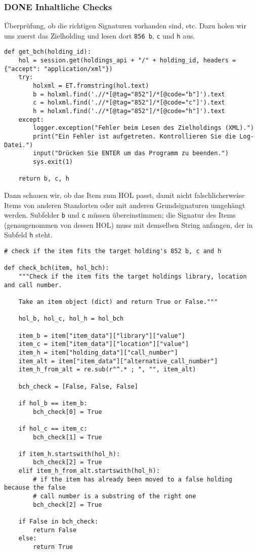 \documentclass[10pt, a4paper]{scrartcl}
\begin{document}
\subsubsection{{\bfseries\sffamily DONE} Inhaltliche Checks}
\label{sec:org2ce0e97}
Überprüfung, ob die richtigen Signaturen vorhanden sind, etc. Dazu holen
wir uns zuerst das Zielholding und lesen dort \texttt{856 b}, \texttt{c} und \texttt{h} aus.

\begin{verbatim}
def get_bch(holding_id):
    hol = session.get(holdings_api + "/" + holding_id, headers = {"accept": "application/xml"})
    try:
        holxml = ET.fromstring(hol.text)
        b = holxml.find('.//*[@tag="852"]/*[@code="b"]').text
        c = holxml.find('.//*[@tag="852"]/*[@code="c"]').text
        h = holxml.find('.//*[@tag="852"]/*[@code="h"]').text
    except:
        logger.exception("Fehler beim Lesen des Zielholdings (XML).")
        print("Ein Fehler ist aufgetreten. Kontrollieren Sie die Log-Datei.")
        input("Drücken Sie ENTER um das Programm zu beenden.")
        sys.exit(1)

    return b, c, h
\end{verbatim}

Dann schauen wir, ob das Item zum HOL passt, damit nicht
falschlicherweise Items von anderen Standorten oder mit anderen
Grundsignaturen umgehängt werden. Subfelder \texttt{b} und \texttt{c} müssen
übereinstimmen; die Signatur des Items (genaugenommen von dessen HOL)
muss mit demselben String anfangen, der in Subfeld \texttt{h} steht.

\begin{verbatim}
# check if the item fits the target holding's 852 b, c and h

def check_bch(item, hol_bch):
    """Check if the item fits the target holdings library, location and call number.

    Take an item object (dict) and return True or False."""

    hol_b, hol_c, hol_h = hol_bch

    item_b = item["item_data"]["library"]["value"]
    item_c = item["item_data"]["location"]["value"]
    item_h = item["holding_data"]["call_number"]
    item_alt = item["item_data"]["alternative_call_number"]
    item_h_from_alt = re.sub(r"^.* ; ", "", item_alt)

    bch_check = [False, False, False]

    if hol_b == item_b:
        bch_check[0] = True

    if hol_c == item_c:
        bch_check[1] = True

    if item_h.startswith(hol_h):
        bch_check[2] = True
    elif item_h_from_alt.startswith(hol_h):
        # if the item has already been moved to a false holding because the false
        # call number is a substring of the right one
        bch_check[2] = True

    if False in bch_check:
        return False
    else:
        return True
\end{verbatim}
\end{document}
